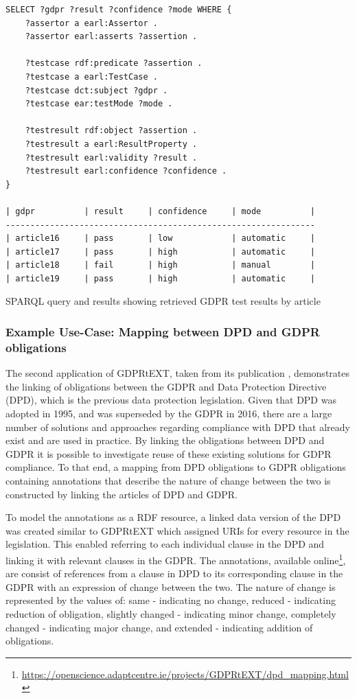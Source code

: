 \begin{listing}
\begin{verbatim}
SELECT ?gdpr ?result ?confidence ?mode WHERE {
    ?assertor a earl:Assertor .
    ?assertor earl:asserts ?assertion .

    ?testcase rdf:predicate ?assertion .
    ?testcase a earl:TestCase .
    ?testcase dct:subject ?gdpr .
    ?testcase ear:testMode ?mode .

    ?testresult rdf:object ?assertion .
    ?testresult a earl:ResultProperty .
    ?testresult earl:validity ?result .
    ?testresult earl:confidence ?confidence .
}

| gdpr          | result     | confidence     | mode          |
---------------------------------------------------------------
| article16     | pass       | low            | automatic     |
| article17     | pass       | high           | automatic     |
| article18     | fail       | high           | manual        |
| article19     | pass       | high           | automatic     |
\end{verbatim}
\label{listing:vocabs:gdprtext-sparql}
\caption{SPARQL query and results showing retrieved GDPR test results by article}
\end{listing}

\subsubsection{Example Use-Case: Mapping between DPD and GDPR obligations}
The second application of GDPRtEXT, taken from its publication \cite{pandit_gdprtext_2018}, demonstrates the linking of obligations between the GDPR and Data Protection Directive (DPD), which is the previous data protection legislation. Given that DPD was adopted in 1995, and was superseded by the GDPR in 2016, there are a large number of solutions and approaches regarding compliance with DPD that already exist and are used in practice. By linking the obligations between DPD and GDPR it is possible to investigate reuse of these existing solutions for GDPR compliance. To that end, a mapping from DPD obligations to GDPR obligations containing annotations that describe the nature of change between the two is constructed by linking the articles of DPD and GDPR.

To model the annotations as a RDF resource, a linked data version of the DPD was created similar to GDPRtEXT which assigned URIs for every resource in the legislation. This enabled referring to each individual clause in the DPD and linking it with relevant clauses in the GDPR. 
The annotations, available online\footnote{\url{https://openscience.adaptcentre.ie/projects/GDPRtEXT/dpd_mapping.html}}, are consist of references from a clause in DPD to its corresponding clause in the GDPR with an expression of change between the two. The nature of change is represented by the values of: same - indicating no change, reduced - indicating reduction of obligation, slightly changed - indicating minor change, completely changed - indicating major change, and extended - indicating addition of obligations.

